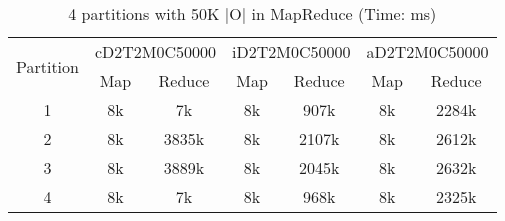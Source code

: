 \begin{table*}[t]
  \centering
\makeatletter
    \long{}
\makeatother
  \caption{4 partitions with 50K |O| in MapReduce (Time: ms)}
    \vspace*{3pt}
  \footnotesize

  \label{table:partition6}
  \begin{tabular}{|c||c|c|c|c|c|c|}
  \hline
  \multirow{2}{*}{Partition} &  \multicolumn{2}{|c|}{cD2T2M0C50000} & \multicolumn{2}{|c|}{iD2T2M0C50000} &\multicolumn{2}{|c|}{aD2T2M0C50000} \\\cline{2-7}
    &  Map & Reduce & Map & Reduce & Map & Reduce \\\hline\hline

\cline{2-7}
    1 & 8k & 7k  & 8k & 907k & 8k & 2284k \\\hline

\cline{2-7}
    2 & 8k & 3835k  & 8k & 2107k & 8k & 2612k \\\hline

\cline{2-7}
    3 & 8k & 3889k  & 8k & 2045k & 8k & 2632k  \\\hline
    
\cline{2-7}
    4 & 8k & 7k  & 8k & 968k & 8k & 2325k  \\\hline

  \end{tabular}
  \vspace*{-17pt}
\end{table*}



